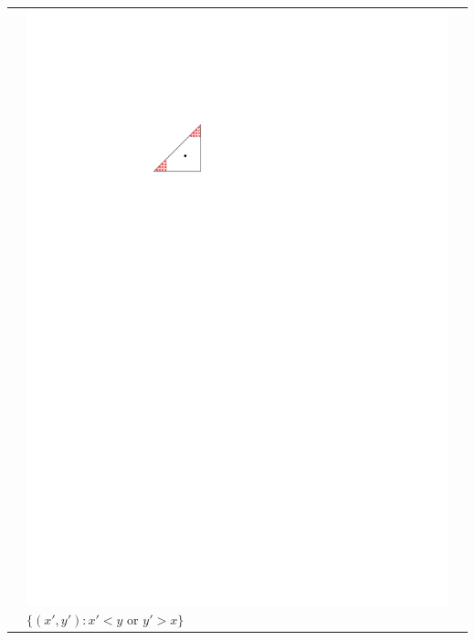 \documentclass{patmorin}
\begin{document}
\begin{table}
\begin{center}
\begin{tabular}{m{1ex}|>{\centering\arraybackslash}m{}|>{\centering\arraybackslash}m{}}
           & \includegraphics[scale=.9]{figs/killersb-3} \break%
             $\{(x',y'): x' < y\text{ or } y'> x\}$ \\

\end{tabular}
\end{center}
\end{table}
\end{document}

